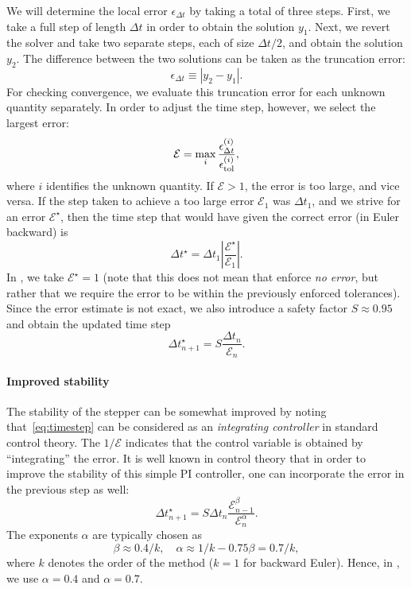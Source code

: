 \documentclass{notes}
\newcommand{\Deltats}{\Delta t^\star}
\newcommand{\epst}{\epsilon_{\Delta t}}
\newcommand{\epstol}{\epsilon_{\rm tol}}
\newcommand{\Eps}{\mathcal{E}}
\begin{document}
    We will determine the local error $\epst$ by taking a total of three steps.
    First, we take a full step of length $\Delta t$ in order to obtain the
    solution $y_1$. Next, we revert the solver and take two separate steps, each
    of size $\Delta t/2$, and obtain the solution $y_2$. The difference between
    the two solutions can be taken as the truncation error:
    \begin{equation}
        \epst\equiv \left| y_2 - y_1 \right|.
    \end{equation}
    For checking convergence, we evaluate this truncation error for each unknown
    quantity separately. In order to adjust the time step, however, we select
    the largest error:
    \begin{equation}
        \Eps = \max_i\frac{\epst^{(i)}}{\epstol^{(i)}},
    \end{equation}
    where $i$ identifies the unknown quantity. If $\Eps > 1$, the error is too
    large, and vice versa. If the step taken to achieve a too large error
    $\Eps_1$ was $\Delta t_1$, and we strive for an error $\Eps^\star$, then the time step
    that would have given the correct error (in Euler backward) is
    \begin{equation}
        \Deltats = \Delta t_1\left|\frac{\Eps^\star}{\Eps_1}\right|.
    \end{equation}
    In \DREAM, we take $\Eps^\star = 1$ (note that this does not mean that enforce
    \emph{no error}, but rather that we require the error to be within the
    previously enforced tolerances). Since the error estimate is not exact, we
    also introduce a safety factor $S\approx0.95$ and obtain the updated time
    step
    \begin{equation}\label{eq:timestep}
        \Deltats_{n+1} = S\frac{\Delta t_n}{\Eps_n}.
    \end{equation}

    \paragraph{Improved stability}
    The stability of the stepper can be somewhat improved by noting
    that~\eqref{eq:timestep} can be considered as an
    \emph{integrating controller} in standard control theory. The $1/\Eps$
    indicates that the control variable is obtained by ``integrating'' the
    error. It is well known in control theory that in order to improve the
    stability of this simple PI controller, one can incorporate the error in
    the previous step as well:
    \begin{equation}
        \Deltats_{n+1} = S\Delta t_n \frac{\Eps_{n-1}^\beta}{\Eps_n^{\alpha}}.
    \end{equation}
    The exponents $\alpha$ are typically chosen as
    \begin{equation}
        \beta\approx 0.4/k,\quad \alpha\approx 1/k-0.75\beta = 0.7/k,
    \end{equation}
    where $k$ denotes the order of the method ($k=1$ for backward Euler). Hence,
    in \DREAM, we use $\alpha = 0.4$ and $\alpha = 0.7$.
\end{document}
